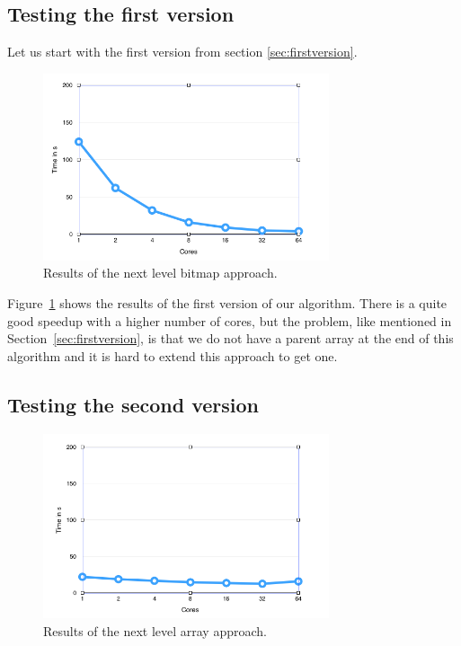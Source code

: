 \documentclass[12pt,a4paper]{article}
\begin{document}
\subsection{Testing the first version}

Let us start with the first version from section \ref{sec:firstversion}.

\begin{figure}[!ht]
   \centering
   \includegraphics[width=0.75\textwidth]{next_level}
   \caption{Results of the next level bitmap approach.}
   \label{fig:nextbitmap}
\end{figure}

Figure~\ref{fig:nextbitmap} shows the results of the first version of our algorithm. There is a quite good speedup with a higher number of cores, but the problem, like mentioned in Section~\ref{sec:firstversion}, is that we do not have a parent array at the end of this algorithm and it is hard to extend this approach to get one.

\subsection{Testing the second version}

\begin{figure}[!ht]
   \centering
   \includegraphics[width=0.75\textwidth]{parent_array}
   \caption{Results of the next level array approach.}
   \label{fig:parentarray}
\end{figure}
\end{document}
